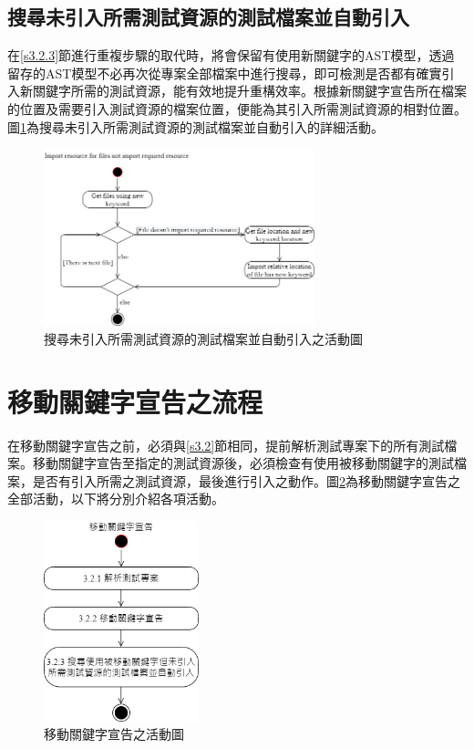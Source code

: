 \subsection{搜尋未引入所需測試資源的測試檔案並自動引入}\label{s3.2.4}
\indent
在\ref{s3.2.3}節進行重複步驟的取代時，將會保留有使用新關鍵字的AST模型，透過留存的AST模型不必再次從專案全部檔案中進行搜尋，即可檢測是否都有確實引入新關鍵字所需的測試資源，能有效地提升重構效率。根據新關鍵字宣告所在檔案的位置及需要引入測試資源的檔案位置，便能為其引入所需測試資源的相對位置。圖\ref{f3.5}為搜尋未引入所需測試資源的測試檔案並自動引入的詳細活動。

\begin{figure}[H]
    \centering
    \includegraphics[width=0.7\textwidth]{picture/Import_resource_for_files_not_import_required_resource.png}
    \caption{搜尋未引入所需測試資源的測試檔案並自動引入之活動圖}
    \label{f3.5}
\end{figure}

\section{移動關鍵字宣告之流程}\label{s3.3}
\indent
在移動關鍵字宣告之前，必須與\ref{s3.2}節相同，提前解析測試專案下的所有測試檔案。移動關鍵字宣告至指定的測試資源後，必須檢查有使用被移動關鍵字的測試檔案，是否有引入所需之測試資源，最後進行引入之動作。圖\ref{f3.6}為移動關鍵字宣告之全部活動，以下將分別介紹各項活動。

\begin{figure}[H]
    \centering
    \includegraphics[width=0.4\textwidth]{picture/Move_definition_of_keyword.png}
    \caption{移動關鍵字宣告之活動圖}
    \label{f3.6}
\end{figure}

